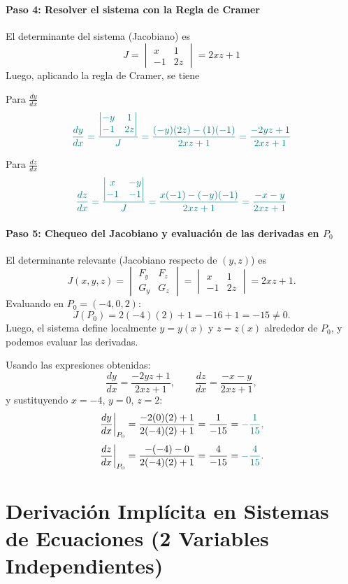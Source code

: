 \documentclass{article}
\begin{document}
\paragraph{Paso 4: Resolver el sistema con la Regla de Cramer}  
El determinante del sistema (Jacobiano) es
\[
J = \begin{vmatrix}
x & 1 \\
-1 & 2z
\end{vmatrix} = 2xz + 1
\]
Luego, aplicando la regla de Cramer, se tiene

Para \( \displaystyle \frac{dy}{dx} \)
\[\color{teal}
\frac{dy}{dx} =
\frac{
\begin{vmatrix}
-y & 1 \\
-1 & 2z
\end{vmatrix}
}{J}
=
\frac{(-y)(2z) - (1)(-1)}{2xz+1}
=
\frac{-2yz+1}{2xz+1}
\]

Para \( \displaystyle \frac{dz}{dx} \)
\[\color{teal}
\frac{dz}{dx} =
\frac{
\begin{vmatrix}
x & -y \\
-1 & -1
\end{vmatrix}
}{J}
=
\frac{x(-1)-(-y)(-1)}{2xz+1}
=
\frac{-x-y}{2xz+1}
\]

\paragraph{Paso 5: Chequeo del Jacobiano y evaluación de las derivadas en $P_0$}
El determinante relevante (Jacobiano respecto de \((y,z)\)) es
\[
J(x,y,z)=
\begin{vmatrix}
F_y & F_z\\
G_y & G_z
\end{vmatrix}
=
\begin{vmatrix}
x & 1\\
-1 & 2z
\end{vmatrix}
=2xz+1.
\]
Evaluando en \(P_0=(-4,0,2)\):
\[
J(P_0)=2(-4)(2)+1=-16+1=-15\neq 0.
\]
Luego, el sistema define localmente \(y=y(x)\) y \(z=z(x)\) alrededor de \(P_0\), y podemos evaluar las derivadas.

Usando las expresiones obtenidas:
\[
\frac{dy}{dx}=\frac{-2yz+1}{2xz+1},
\qquad
\frac{dz}{dx}=\frac{-x-y}{2xz+1},
\]
y sustituyendo \(x=-4\), \(y=0\), \(z=2\):
\[
\left.\frac{dy}{dx}\right|_{P_0}
=
\frac{-2(0)(2)+1}{2(-4)(2)+1}
=
\frac{1}{-15}
=\color{teal}
-\frac{1}{15},
\]
\[
\left.\frac{dz}{dx}\right|_{P_0}
=
\frac{-(-4)-0}{2(-4)(2)+1}
=
\frac{4}{-15}
=\color{teal}
-\frac{4}{15}.
\]

\section*{Derivación Implícita en Sistemas de Ecuaciones (2 Variables Independientes)}
\end{document}
